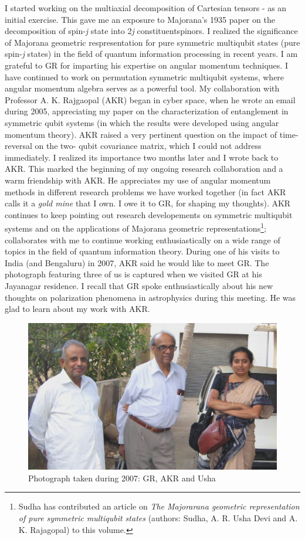 I started working on the multiaxial decomposition of Cartesian tensors - as an initial exercise. This gave me an exposure to Majorana's 1935 paper on the decomposition of spin-\textit{j} state into 2\textit{j} constituent\break spinors. I realized the significance of Majorana geometric respresentation for pure symmetric multiqubit states (pure spin-\textit{j} states) in the field of quantum information processing in recent years. I am grateful to GR for imparting his expertise on angular momentum techniques. I have continued to work on permutation symmetric multiqubit systems, where angular momentum algebra serves as a powerful tool. My collaboration with Professor A. K. Rajgaopal (AKR) began in cyber space, when he wrote an email during 2005, appreciating my paper on the characterization of entanglement in symmetric qubit systems (in which the results were developed using angular momentum theory). AKR raised a very pertinent question on the impact of time-reversal on the two- qubit covariance matrix, which I could not address immediately. I realized its importance two months later and I wrote back to AKR. This marked the beginning of my ongoing research collaboration and a warm friendship with AKR. He appreciates my use of angular momentum methods in different research problems we have worked together (in fact AKR calls it a \textit{gold mine} that I own. I owe it to GR, for shaping my thoughts). AKR continues to keep pointing out research developements on symmetric multiqubit systems and on the applications of Majorana geometric representations\footnote{Sudha has contributed an article on \textit{The Majorarana  geometric representation of pure symmetric multiqubit states} (authors: Sudha, A. R. Usha Devi and A. K. Rajagopal) to this volume.}; collaborates with me to continue working enthusiastically on a wide range of topics in the field of quantum information theory. During one of his visits to India (and Bengaluru) in 2007, AKR said he would like to meet GR. The photograph featuring three of us is captured when we visited GR at his Jayanagar residence. I recall that GR spoke enthusiastically about his new thoughts on polarization phenomena in astrophysics during this meeting. He was glad to learn about my work with AKR.

\begin{figure}[t]
\centering
\includegraphics[scale=0.21]{src/images/chap18/001.eps}
\caption{Photograph taken during 2007: GR, AKR and Usha}\label{chap18-fig001}
\end{figure}

